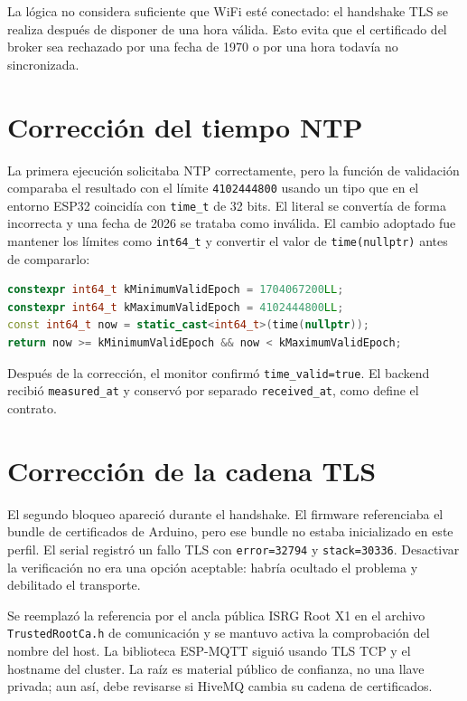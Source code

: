 \documentclass[10pt,a4paper]{article}
\newcommand{\code}[1]{\texttt{\small #1}}
\begin{document}
La lógica no considera suficiente que WiFi esté conectado: el handshake TLS se
realiza después de disponer de una hora válida. Esto evita que el certificado
del broker sea rechazado por una fecha de 1970 o por una hora todavía no
sincronizada.

\section{Corrección del tiempo NTP}

La primera ejecución solicitaba NTP correctamente, pero la función de validación
comparaba el resultado con el límite \code{4102444800} usando un tipo que en el
entorno ESP32 coincidía con \code{time\_t} de 32 bits. El literal se convertía
de forma incorrecta y una fecha de 2026 se trataba como inválida. El cambio
adoptado fue mantener los límites como \code{int64\_t} y convertir el valor de
\code{time(nullptr)} antes de compararlo:

\begin{lstlisting}[language=C++]
constexpr int64_t kMinimumValidEpoch = 1704067200LL;
constexpr int64_t kMaximumValidEpoch = 4102444800LL;
const int64_t now = static_cast<int64_t>(time(nullptr));
return now >= kMinimumValidEpoch && now < kMaximumValidEpoch;
\end{lstlisting}

Después de la corrección, el monitor confirmó \code{time\_valid=true}. El
backend recibió \code{measured\_at} y conservó por separado
\code{received\_at}, como define el contrato.

\section{Corrección de la cadena TLS}

El segundo bloqueo apareció durante el handshake. El firmware referenciaba el
bundle de certificados de Arduino, pero ese bundle no estaba inicializado
en este perfil. El serial registró un fallo TLS con \code{error=32794} y
\code{stack=30336}. Desactivar la verificación no era una opción aceptable:
habría ocultado el problema y debilitado el transporte.

Se reemplazó la referencia por el ancla pública ISRG Root X1 en el archivo
\code{TrustedRootCa.h} de comunicación y se mantuvo activa la comprobación
del nombre del host. La biblioteca ESP-MQTT siguió
usando TLS TCP y el hostname del cluster. La raíz es material público de
confianza, no una llave privada; aun así, debe revisarse si HiveMQ cambia su
cadena de certificados.
\end{document}
